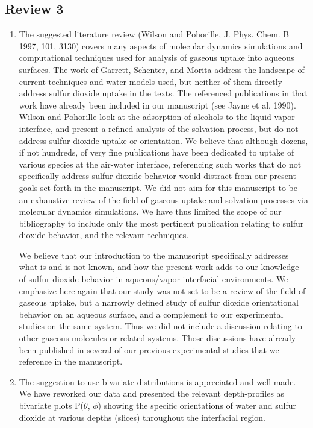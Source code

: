 \documentclass{article}
\begin{document}
\subsection*{Review 3}
\begin{enumerate}
\item The suggested literature review (Wilson and Pohorille, J. Phys. Chem. B 1997, 101, 3130) covers many aspects of molecular dynamics simulations and computational techniques used for analysis of gaseous uptake into aqueous surfaces. The work of Garrett, Schenter, and Morita address the landscape of current techniques and water models used, but neither of them directly address sulfur dioxide uptake in the texts. The referenced publications in that work have already been included in our manuscript (see Jayne et al, 1990). Wilson and Pohorille look at the adsorption of alcohols to the liquid-vapor interface, and present a refined analysis of the solvation process, but do not address sulfur dioxide uptake or orientation. We believe that although dozens, if not hundreds, of very fine publications have been dedicated to uptake of various species at the air-water interface, referencing such works that do not specifically address sulfur dioxide behavior would distract from our present goals set forth in the manuscript. We did not aim for this manuscript to be an exhaustive review of the field of gaseous uptake and solvation processes via molecular dynamics simulations. We have thus limited the scope of our bibliography to include only the most pertinent publication relating to sulfur dioxide behavior, and the relevant techniques.

We believe that our introduction to the manuscript specifically addresses what is and is not known, and how the present work adds to our knowledge of sulfur dioxide behavior in aqueous/vapor interfacial environments. We emphasize here again that our study was not set to be a review of the field of gaseous uptake, but a narrowly defined study of sulfur dioxide orientational behavior on an aqueous surface, and a complement to our experimental studies on the same system. Thus we did not include a discussion relating to other gaseous molecules or related systems. Those discussions have already been published in several of our previous experimental studies that we reference in the manuscript.

\item The suggestion to use bivariate distributions is appreciated and well made. We have reworked our data and presented the relevant depth-profiles as bivariate plots P($\theta$, $\phi$) showing the specific orientations of water and sulfur dioxide at various depths (slices) throughout the interfacial region.


\end{enumerate}
\end{document}
